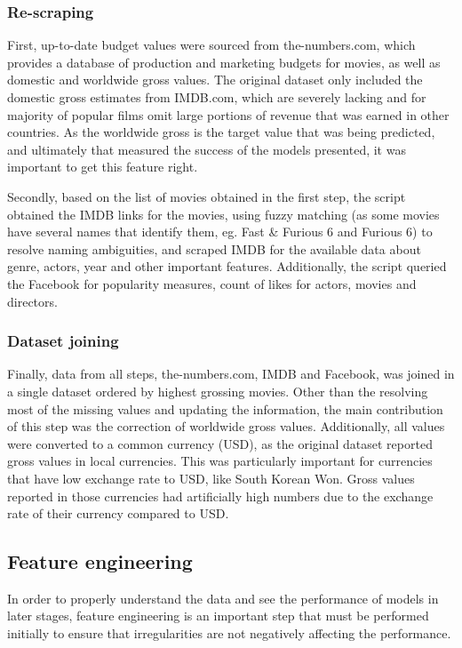 \subsubsection{Re-scraping}
First, up-to-date budget values were sourced from the-numbers.com, which provides a database of production and marketing budgets for movies, as well as domestic and worldwide gross values. The original dataset only included the domestic gross estimates from IMDB.com, which are severely lacking and for majority of popular films omit large portions of revenue that was earned in other countries.  As the worldwide gross is the target value that was being predicted, and ultimately that measured the success of the models presented, it was important to get this feature right.

Secondly, based on the list of movies obtained in the first step, the script obtained the IMDB links for the movies, using fuzzy matching (as some movies have several names that identify them, eg. Fast \& Furious 6 and Furious 6) to resolve naming ambiguities, and scraped IMDB for the available data about genre, actors, year and other important features. Additionally, the script queried the Facebook for popularity measures, count of likes for actors, movies and directors.

\subsubsection{Dataset joining}
Finally, data from all steps, the-numbers.com, IMDB and Facebook, was joined in a single dataset ordered by highest grossing movies. Other than the resolving most of the missing values and updating the information, the main contribution of this step was the correction of worldwide gross values. Additionally, all values were converted to a common currency (USD), as the original dataset reported gross values in local currencies. This was particularly important for currencies that have low exchange rate to USD, like South Korean Won. Gross values reported in those currencies had artificially high numbers due to the exchange rate of their currency compared to USD.


\subsection{Feature engineering}
In order to properly understand the data and see the performance of models in later stages, feature engineering is an important step that must be performed initially to ensure that irregularities are not negatively affecting the performance.

